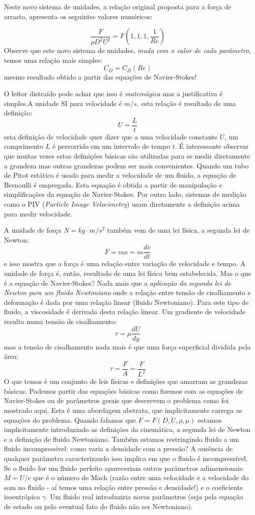 Neste novo sistema de unidades, a relação original proposta para a força de arrasto, apresenta os seguintes valores numéricos:

\[
\frac{F}{\rho D^2 U^2} = F\left(1,1,1, \frac{1}{Re} \right)
\]
Observe que este novo sistema de unidades, \emph{ muda com o valor de cada parâmetro}, temos uma relação mais simples:
\[
C_D = C_D(Re)
\]
mesmo resultado obtido a partir das equações de Navier-Stokes!

O leitor distraído pode achar que isso é \emph{matemágica} mas a justificativa é simples.A unidade SI para velocidade é $m/s$, esta relação é resultado de uma definição:
\[
U = \frac{L}{t}
\]
esta definição de velocidade quer dizer que a uma velocidade constante $U$, um comprimento $L$ é percorrido em um intervalo de tempo $t$. É interessante observar que muitas vezes estas definições básicas são utilizadas para se medir diretamente a grandeza mas outras grandezas podem ser mais convenientes. Quando um tubo de Pitot estático é usado para medir a velocidade de um fluido, a equação de Bernoulli é empregada. Esta equação é obtida a partir de manipulação e simplificações da equação de Navier-Stokes. Por outro lado, sistemas de medição como o PIV (\emph{Particle Image Velocimetry}) usam diretamente a definição acima para medir velocidade.

A unidade de força $N = kg\cdot m/s^2$ também vem de uma lei física, a segunda lei de Newton:
\[
F = ma = m\frac{dv}{dt}
\]
e isso mostra que a força é uma relação entre variação de velocidade e tempo. A unidade de força é, então, resultado de uma lei física bem estabelecida. Mas o que é a equação de Navier-Stokes? Nada mais que a \emph{aplicação da segunda lei de Newton para um fluido  Newtoniano} onde a relação entre tensão de cisalhamento e deformação é dada por uma relação linear (fluido Newtoniano). Para este tipo de fluido, a viscosidade é derivada desta relação linear. Um gradiente de velocidade resulta numa tensão de cisalhamento:
\[
\tau = \mu \frac{dU}{dy}
\]
mas a tensão de cisalhamento nada mais é que uma força superficial dividida pela área:
\[
\tau = \frac{F}{A} = \frac{F}{L^2}
\]
O que temos é um conjunto de leis físicas e definições que amarram as grandezas básicas. Podemos partir das equações básicas como fizemos com as equações de Navier-Stokes ou de parâmetros gerais que descrevem o problema como foi mostrado aqui. Esta é uma abordagem abstrata, que implicitamente carrega as equações do problema. Quando falamos que $F = F(D, U, \rho, \mu)$ estamos implicitamente introduzindo as definições da cinemática, a segunda lei de Newton e a definição de fluido Newtoniano. Também estamos restringindo fluido a um fluido incompressível: como varia a densidade com a pressão? A ausência de qualquer parâmetro caracterizando isso implica em que o fluido é incompressível. Se o fluido for um fluido perfeito apareceriam outros parâmetros adimensionais: $M = U/c$ que é o número de Mach (razão entre uma velocidade e a velocidade do som no fluido - aí temos uma relação entre pressão e densidade!) e o coeficiente isoentrópico $\gamma$. Um fluido real introduziria novos parâmetros (seja pela equação de estado ou pelo eventual fato do fluido não ser Newtoniano). 

